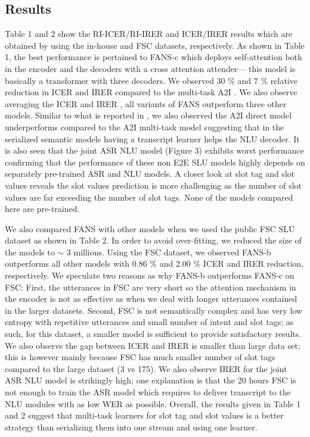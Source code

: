 \documentclass[a4paper]{article}
\begin{document}
\subsection{Results}
Table 1 and 2 show the RI-ICER/RI-IRER and ICER/IRER results which are obtained by using the in-house and FSC datasets, respectively. As shown in Table 1,  the best performance is pertained to FANS-c  which deploys self-attention both in the encoder and the decoders with a cross attention attender--- this model  is basically a transformer with three decoders. We observed  30 \%  and 7 \% relative reduction in ICER and IRER compared to the multi-task A2I  \cite{haghani2018audio}. We also observe averaging the ICER and IRER , all variants of FANS outperform three other models. Similar to what is reported in \cite{haghani2018audio}, we also observed the  A2I direct model underperforms compared to the A2I multi-task model suggesting that in the serialized semantic models having a transcript learner helps the NLU decoder. It is also seen that the joint ASR NLU model (Figure 3) exhibits worst performance confirming that the performance of these non E2E  SLU models highly depends on separately pre-trained ASR and NLU models.   A closer look at slot tag and slot values reveals the slot values prediction is more challenging as the number of slot values  are far exceeding the number of slot tags.  None of the models compared here are pre-trained.


We also compared FANS with other models when we used the public FSC SLU dataset as shown in Table 2. In order to avoid over-fitting, we reduced the size of the models to $\sim$ 3 millions. Using the FSC dataset, we observed  FANS-b outperforms all other models with 0.86 \% and 2.00 \% ICER  and IRER reduction, respectively.  We speculate two reasons as why FANS-b outperforms FANS-c on FSC: First, the utterances in FSC are very short so the attention mechanism in the encoder is not as effective as when we deal with longer utterances contained in the larger datasets. Second, FSC  is not semantically complex and has very low entropy with repetitive utterances and small number of  intent  and slot tags; as such, for this dataset, a smaller model is sufficient to provide satisfactory results.  We also observe the gap between ICER and IRER is smaller than large data set; this is however mainly because FSC has much smaller number of slot tags compared to the large dataset (3 vs 175).  We also observe IRER for the joint ASR NLU model is strikingly high; one explanation is that the 20 hours FSC is not enough to train the ASR model which requires to deliver transcript to the NLU modules with as low WER as possible. Overall, the results  given in Table 1 and 2 suggest that multi-task learners for slot tag and slot values is a better strategy than serializing them into one stream and using one learner.
\end{document}
